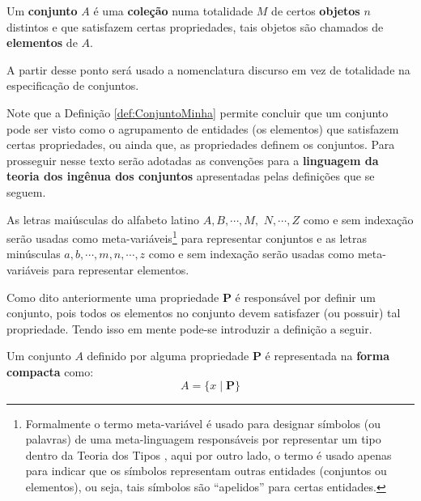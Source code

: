 \begin{definition}\label{def:ConjuntoMinha}
	Um \textbf{conjunto} $A$ é uma \textbf{coleção} numa totalidade $M$ de certos \textbf{objetos} $n$ distintos e que satisfazem certas propriedades, tais objetos são chamados de \textbf{elementos} de $A$.
\end{definition}

\begin{remark}
	A partir desse ponto será usado a nomenclatura discurso em vez de totalidade na especificação de conjuntos.
\end{remark}

Note que a Definição \ref{def:ConjuntoMinha} permite concluir que um conjunto pode ser visto como o agrupamento de entidades (os elementos) que satisfazem certas propriedades, ou ainda que, as propriedades definem os conjuntos. Para prosseguir nesse texto serão adotadas as convenções para a \textbf{linguagem da teoria dos ingênua dos conjuntos} apresentadas pelas definições que se seguem.

\begin{definition}\label{def:NotacaoConjuntos1}
	As letras maiúsculas do alfabeto latino $A, B, \cdots, M,$ $N, \cdots, Z$ como e sem indexação serão usadas como meta-variáveis\footnote{Formalmente o termo meta-variável é usado para designar símbolos (ou palavras) de uma meta-linguagem responsáveis por representar um tipo dentro da Teoria dos Tipos \cite{sato2003}, aqui por outro lado, o termo é usado apenas para indicar que os símbolos representam outras entidades (conjuntos ou elementos), ou seja, tais símbolos são ``apelidos'' para certas entidades.} para representar conjuntos e as letras minúsculas $a, b, \cdots, m, n, \cdots, z$ como e sem indexação serão usadas como meta-variáveis para representar elementos.
\end{definition}

Como dito anteriormente uma propriedade $\textbf{P}$ é responsável por definir um conjunto, pois todos os elementos no conjunto devem satisfazer (ou possuir) tal propriedade. Tendo isso em mente pode-se introduzir a definição a seguir.

\begin{definition}\label{def:NotacaoCompacta}
	Um conjunto $A$ definido por alguma propriedade $\textbf{P}$ é representada na \textbf{forma compacta} como:
	\begin{equation}
		A = \{ x \mid \textbf{P}\}
	\end{equation}
\end{definition}

